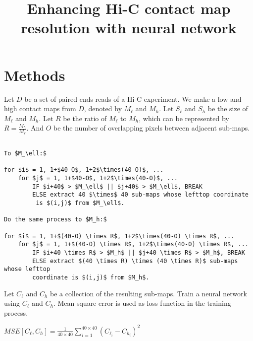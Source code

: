 \documentclass{article}
\begin{document}
\title{Enhancing Hi-C contact map resolution with neural network}
\author{}
\maketitle



\section{Methods}


Let $D$ be a set of paired ends reads of a Hi-C experiment. 
We make a low and high contact maps from $D$, denoted by $M_\ell$ and $M_h$. 
Let $S_\ell$ and $S_h$ be the size of $M_\ell$ and $M_h$. 
Let $R$ be the ratio of $M_\ell$ to $M_h$, which can be represented by
$R = \frac{M_h}{M_\ell}$. And $O$ be the number of overlapping pixels between adjacent sub-maps.

\begin{Verbatim}[commandchars=\\\{\},codes={\catcode`$=3\catcode`_=8\catcode`^=7}]
% Divide matrices $M_\ell$ and $M_h$ \

To $M_\ell:$

for $i$ = 1, 1+$40-O$, 1+2$\times(40-O)$, ...
    for $j$ = 1, 1+$40-O$, 1+2$\times(40-O)$, ...
        IF $i+40$ > $M_\ell$ || $j+40$ > $M_\ell$, BREAK 
        ELSE extract 40 $\times$ 40 sub-maps whose lefttop coordinate
         is $(i,j)$ from $M_\ell$.

Do the same process to $M_h:$

for $i$ = 1, 1+$(40-O) \times R$, 1+2$\times(40-O) \times R$, ...
    for $j$ = 1, 1+$(40-O) \times R$, 1+2$\times(40-O) \times R$, ...
        IF $i+40 \times R$ > $M_h$ || $j+40 \times R$ > $M_h$, BREAK 
        ELSE extract $(40 \times R) \times (40 \times R)$ sub-maps whose lefttop 
        coordinate is $(i,j)$ from $M_h$.
\end{Verbatim}



\noindent Let $C_\ell$ and $C_h$ be a collection of the resulting sub-maps. 
Train a neural network using $C_\ell$ and $C_h$. Mean square error is used as 
loss function in the training process. 

\begin{center}
    $MSE[C_\ell, C_h] = \frac{1}{40 \times 40} \sum_{i=1}^{40 \times 40} (C_{\ell_i}-C_{h_i})^2$
\end{center}
\end{document}
